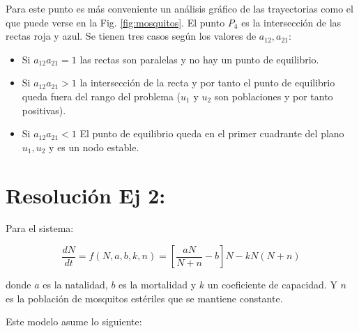 \documentclass[twocolumn,aps,prl]{revtex4-1}
\begin{document}

Para este punto es más conveniente un análisis gráfico de las trayectorias como el que puede verse en la Fig. \ref{fig:mosquitos}. El punto $P_4$ es la intersección de las rectas roja y azul. Se tienen tres casos según los valores de $a_{12}, a_{21}$:

\begin{itemize}
    \item Si $a_{12} a_{21} = 1$ las rectas son paralelas y no hay un punto de equilibrio. 
    \item Si $a_{12} a_{21} > 1$ la intersección de la recta y por tanto el punto de equilibrio queda fuera del rango del problema ($u_1$ y $u_2$ son poblaciones y por tanto positivas). 
    \item Si $a_{12} a_{21} < 1$ El punto de equilibrio queda en el primer cuadrante del plano $u_1, u_2$ y es un nodo estable.
\end{itemize}


% 

\section{Resolución Ej 2:}

Para el sistema:

\begin{equation}\label{eq:esteril1}
    \frac{d N}{d t} = f(N,a,b,k,n) 
    = \left[\frac{a N}{N+n}-b\right] N- k N(N+n)
\end{equation}

donde $a$ es la natalidad, $b$ es la mortalidad y $k$ un coeficiente de capacidad. Y $n$ es la población de mosquitos estériles que se mantiene constante.

Este modelo asume lo siguiente:

\end{document}
